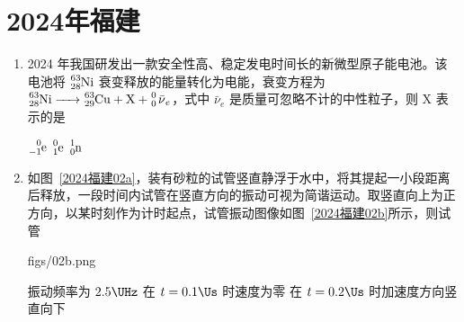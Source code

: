 \documentclass[\gkver]{gaokaozhenti}
\begin{document}
\chapter{2024年福建}

\begin{enumerate}
\item
2024 年我国研发出一款安全性高、稳定发电时间长的新微型原子能电池。该电池将 $\ce{^{63}_{28}Ni}$ 衰变释放的能量转化为电能，衰变方程为 $\ce{^{63}_{28}Ni -> ^{63}_{29}Cu + X + ^0_0 \bar{\nu}_{e}}$，式中 $\bar{\nu}_{e}$ 是质量可忽略不计的中性粒子，则 X 表示的是

{$\ce{^{0}_{-1}e}$}
{$\ce{^{0}_{1}e}$}
{$\ce{^{1}_{0}n}$}


\item
如图~\ref{2024福建02a}，装有砂粒的试管竖直静浮于水中，将其提起一小段距离后释放，一段时间内试管在竖直方向的振动可视为简谐运动。取竖直向上为正方向，以某时刻作为计时起点，试管振动图像如图~\ref{2024福建02b}所示，则试管

{figs/02b.png}

{振动频率为 $2.5 \UHz$}
{在 $t = 0.1 \Us$ 时速度为零}
{在 $t = 0.2 \Us$ 时加速度方向竖直向下}



\end{enumerate}
\end{document}
